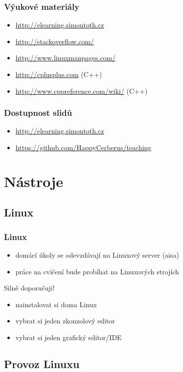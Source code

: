 \begin{frame}
	\frametitle{Výukové materiály}
	\begin{itemize}
		\item{\url{http://elearning.simontoth.cz}}
		\item{\url{http://stackoverflow.com/}}
		\item{\url{http://www.linuxmanpages.com/}}
		\item{\url{http://cplusplus.com} (C++)}
		\item{\url{http://www.cppreference.com/wiki/} (C++)}
	\end{itemize}
\end{frame}

\begin{frame}
	\frametitle{Dostupnost slidů}
	\begin{itemize}
		\item{\url{http://elearning.simontoth.cz}}
		\item{\url{https://github.com/HappyCerberus/teaching}}
	\end{itemize}
\end{frame}

\section{Nástroje}
\subsection{Linux}

\begin{frame}
	\frametitle{Linux}
	\begin{itemize}
		\item{domácí úkoly se odevzdávají na Linuxový server (aisa)}
		\item{práce na cvičení bude probíhat na Linuxových strojích}
	\end{itemize}
	\begin{block}{Silně doporučuji!}
		\begin{itemize}
		\item{nainstalovat si doma Linux}
		\item{vybrat si jeden zkonzolový editor}
		\item{vybrat si jeden grafický editor/IDE}
		\end{itemize}
	\end{block}
\end{frame}

\subsection{Provoz Linuxu}

